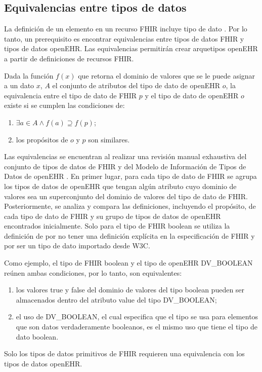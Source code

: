 \subsection{Equivalencias entre tipos de datos}

La definición de un elemento en un recurso FHIR incluye tipo de dato \cite{FHIRElement}. Por lo tanto, un prerequisito es encontrar equivalencias entre tipos de datos FHIR y tipos de datos openEHR. Las equivalencias permitirán crear arquetipos openEHR a partir de definiciones de recursos FHIR.

Dada la función \( f(x) \) que retorna el dominio de valores que se le puede asignar a un dato \( x \), \( A \) el conjunto de atributos del tipo de dato de openEHR \( o \), la equivalencia entre el tipo de dato de FHIR \( p \)  y el tipo de dato de openEHR \( o \) existe si se cumplen las condiciones de:

\begin{enumerate}
  \item \( \exists a \in A \land f(a) \supseteq f(p) \);
  \item los propósitos de \( o \) y \( p \) son similares.
\end{enumerate}

Las equivalencias se encuentran al realizar una revisión manual exhaustiva del conjunto de tipos de datos de FHIR \cite{FHIRDataTypes} y del Modelo de Información de Tipos de Datos de openEHR \cite{openEHRDataTypes}. En primer lugar, para cada tipo de dato de FHIR se agrupa los tipos de datos de openEHR que tengan algún atributo cuyo dominio de valores sea un superconjunto del dominio de valores del tipo de dato de FHIR. Posteriormente, se analiza y compara las definiciones, incluyendo el propósito, de cada tipo de dato de FHIR y su grupo de tipos de datos de openEHR encontrados inicialmente. Solo para el tipo de FHIR boolean se utiliza la definición de \cite{W3C} por no tener una definición explícita en la especificación de FHIR y por ser un tipo de dato importado desde W3C.

Como ejemplo, el tipo de FHIR boolean y el tipo de openEHR DV\_BOOLEAN reúnen ambas condiciones, por lo tanto, son equivalentes:
\begin{enumerate}
  \item los valores true y false del dominio de valores del tipo boolean pueden ser almacenados dentro del atributo value del tipo DV\_BOOLEAN;
  \item el uso de DV\_BOOLEAN, el cual especifica que el tipo se usa para elementos que son datos verdaderamente booleanos, es el mismo uso que tiene el tipo de dato boolean.
\end{enumerate}

Solo los tipos de datos primitivos de FHIR requieren una equivalencia con los tipos de datos openEHR.
